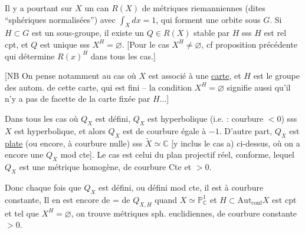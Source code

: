  Il y a pourtant sur $X$ un  can $R(X)$ de métriques riemanniennes (dites ``sphériques normalisées'') avec $\int_X dx=1$, qui forment une orbite sous $G$. Si $H\subset G$ est un sous-groupe, il existe un $Q\in R(X)$ stable par $H$ sss $H$ est rel cpt, et $Q$ est unique sss $X^H=\varnothing$. [Pour le cas $X^H\ne\varnothing$, cf proposition précédente qui détermine $R(x)^H$ dans tous les cas.]


[NB On pense notamment au cas où $X$ est associé à une \uline{carte}, et $H$ est le groupe des autom. de cette carte, qui est fini -- la condition $X^H=\varnothing$ signifie aussi qu'il n'y a pas de facette de la carte fixée par $H$...]

Dans tous les cas où $Q_X$ est défini, $Q_X$ est hyperbolique (i.e. : courbure $<0$) sss $X$ est hyperbolique, et alors $Q_X$ est de courbure  égale à $-1$. D'autre part, $Q_X$ est \uline{plate}  (ou encore, à courbure nulle) sss $\widetilde X\simeq\mathbb C$ [y inclus le cas a) ci-dessus, où on a encore une $Q_X$ mod cte]. Le cas  est celui du plan projectif réel, conforme,   lequel $Q_X$ est une métrique homogène, de courbure Cte  et $>0$.

Donc chaque fois que $Q_X$ est défini, ou défini mod cte, il est à courbure constante,  Il en est encore de = de $Q_{X,H}$ quand $X\simeq\mathbb P^1_{\mathbb C}$ et $H\subset\mathrm{Aut}_{\mathrm{conf}}X$ est cpt et tel que $X^H=\varnothing$, on trouve  métriques sph. euclidiennes,  de courbure constante $>0$.


